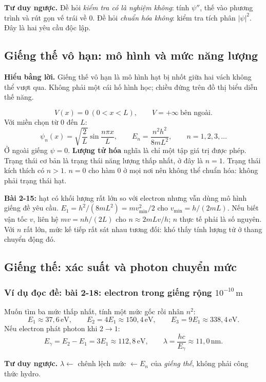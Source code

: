 \documentclass[11pt,a4paper]{article}
\newcommand{\unit}[1]{\,\mathrm{#1}}
\newcommand{\idea}[1]{\par\textbf{Hiểu bằng lời.} #1\par}
\newcommand{\think}[1]{\par\textbf{Tư duy ngược.} #1\par}
\newcommand{\ex}[1]{\subsubsection*{Ví dụ đọc đề: #1}}
\begin{document}
\think{Đề hỏi \emph{kiểm tra có là nghiệm không}:
tính $\psi''$, thế vào phương trình và rút gọn vế trái về 0.
Đề hỏi \emph{chuẩn hóa không}: kiểm tra tích phân $|\psi|^2$.
Đây là hai yêu cầu độc lập.}

\subsection{Giếng thế vô hạn: mô hình và mức năng lượng}\label{sec:well}
\idea{Giếng thế vô hạn là mô hình hạt bị nhốt giữa hai vách không thể vượt qua.
Không phải một cái hố hình học; chiều đứng trên đồ thị biểu diễn thế năng.}
\[
V(x)=0\ (0<x<L),\qquad V=+\infty\ \text{bên ngoài}.
\]
Với miền chọn từ 0 đến $L$:
\[
\psi_n(x)=\sqrt{\frac2L}\sin\frac{n\pi x}{L},\qquad
E_n=\frac{n^2h^2}{8mL^2},\qquad n=1,2,3,\ldots
\]
Ở ngoài giếng $\psi=0$.
\textbf{Lượng tử hóa} nghĩa là chỉ một tập giá trị được phép.
Trạng thái cơ bản là trạng thái năng lượng thấp nhất, ở đây là $n=1$.
Trạng thái kích thích có $n>1$.
$n=0$ cho hàm 0 ở mọi nơi nên không thể chuẩn hóa: không phải trạng thái hạt.

\begin{center}
\end{center}

\textbf{Bài 2-15:} hạt có khối lượng rất lớn so với electron nhưng vẫn dùng
mô hình giếng đề yêu cầu.
$E_1=h^2/(8mL^2)=mv_{\min}^2/2$ cho
$v_{\min}=h/(2mL)$.
Nếu biết vận tốc $v$, liên hệ
$mv=nh/(2L)$ cho $n\approx2mLv/h$; $n$ thực tế phải là số nguyên.
Với $n$ rất lớn, mức kế tiếp rất sát nhau tương đối: khó thấy tính lượng tử
ở thang chuyển động đó.

\subsection{Giếng thế: xác suất và photon chuyển mức}\label{sec:wellpractice}
\ex{bài 2-18: electron trong giếng rộng $10^{-10}\unit m$}
Muốn tìm ba mức thấp nhất, tính một mức gốc rồi nhân $n^2$:
\[
E_1\approx37{,}6\unit{eV},\qquad
E_2=4E_1\approx150{,}4\unit{eV},\qquad
E_3=9E_1\approx338{,}4\unit{eV}.
\]
Nếu electron phát photon khi $2\to1$:
\[
E_\gamma=E_2-E_1=3E_1\approx112{,}8\unit{eV},\qquad
\lambda=\frac{hc}{E_\gamma}\approx11{,}0\unit{nm}.
\]
\think{$\lambda\leftarrow$ chênh lệch mức
$\leftarrow E_n$ của \emph{giếng thế}, không phải công thức hydro.}
\end{document}

